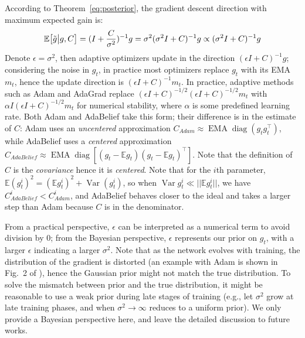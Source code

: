 \documentclass{article}
\begin{document}
According to Theorem~\ref{eq:posterior}, the gradient descent direction with maximum expected gain is:
\begin{equation}
\label{eq:expectation}
    \mathbb{E}\big[ \Tilde{g} \big \vert g, C \big] = (I + \frac{C}{\sigma^2})^{-1} g = \sigma^2 (\sigma^2 I + C)^{-1} g \propto (\sigma^2 I + C)^{-1} g
\end{equation}
Denote $\epsilon = \sigma^2$, then adaptive optimizers update in the direction $(\epsilon I + C)^{-1} g$; considering the noise in $g_t$, in practice most optimizers replace $g_t$ with its EMA $m_t$, hence the update direction is $(\epsilon I + C)^{-1} m_t$. In practice, adaptive methods such as Adam and AdaGrad replace $(\epsilon I + C)^{-1/2} (\epsilon I + C)^{-1/2} m_t$ with $\alpha I (\epsilon I + C)^{-1/2} m_t$ for numerical stability, where $\alpha$ is some predefined learning rate. Both Adam and AdaBelief take this form; their difference is in the estimate of $C$: Adam uses an \textit{uncentered} approximation $C_{Adam}\approx \operatorname{EMA} \operatorname{diag} (g_t g_t^\top)$, while AdaBelief uses a \textit{centered} approximation $C_{AdaBelief} \approx \operatorname{EMA} \operatorname{diag}[ (g_t - \mathbb{E}g_t)(g_t - \mathbb{E}g_t) ^\top]$. Note that the definition of $C$ is the \textit{covariance} hence it is \textit{centered}. Note that for the $i$th parameter, $\mathbb{E} (g_t^i)^2 = (\mathbb{E}g_t^i)^2 + \operatorname{Var}(g_t^i)$, so when $\operatorname{Var}g_t^i \ll \vert \vert \mathbb{E}g_t^i \vert \vert$, we have $C_{AdaBelief}^i < C_{Adam}^i$, and AdaBelief behaves closer to the ideal and takes a larger step than Adam because $C$ is in the denominator. 

From a practical perspective, $\epsilon$ can be interpreted as a numerical term to avoid division by 0; from the Bayesian perspective, $\epsilon$ represents our prior on $g_t$, with a larger $\epsilon$ indicating a larger $\sigma^2$. Note that %
as the network evolves with training, the distribution of the gradient is distorted (an example with Adam is shown in Fig.~2 of \cite{liu2019variance}), hence the Gaussian prior might not match the true distribution.
To solve the mismatch between prior and the true distribution, it might be reasonable to use a weak prior during late stages of training (e.g., let $\sigma^2$ grow at late training phases, and when $\sigma^2 \rightarrow \infty$ reduces to a uniform prior). We only provide a Bayesian perspective here, and leave the detailed discussion to future works.
\end{document}

